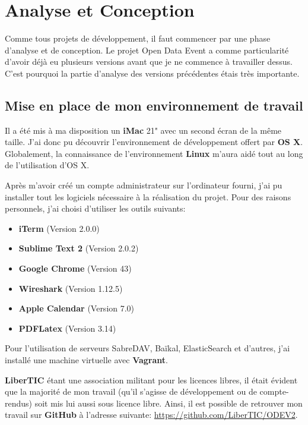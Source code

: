 \section{Analyse et Conception}

Comme tous projets de développement, il faut commencer par une phase d'analyse et de conception. Le projet Open Data Event a comme particularité d'avoir déjà eu plusieurs versions avant que je ne commence à travailler dessus. C'est pourquoi la partie d'analyse des versions précédentes étais très importante.

\subsection{Mise en place de mon environnement de travail}

Il a été mis à ma disposition un \textbf{iMac} 21" avec un second écran de la même taille. J'ai donc pu découvrir l'environnement de développement offert par \textbf{OS X}. Globalement, la connaissance de l'environnement \textbf{Linux} m'aura aidé tout au long de l'utilisation d'OS X.

Après m'avoir créé un compte administrateur sur l'ordinateur fourni, j'ai pu installer tout les logiciels nécessaire à la réalisation du projet. Pour des raisons personnels, j'ai choisi d'utiliser les outils suivants:

\begin{itemize}
    \item \textbf{iTerm} (Version 2.0.0)
    \item \textbf{Sublime Text 2} (Version 2.0.2)
    \item \textbf{Google Chrome} (Version 43)
    \item \textbf{Wireshark} (Version 1.12.5)
    \item \textbf{Apple Calendar} (Version 7.0)
    \item \textbf{PDFLatex} (Version 3.14)
\end{itemize}

Pour l'utilisation de serveurs SabreDAV, Baïkal, ElasticSearch et d'autres, j'ai installé une machine virtuelle avec \textbf{Vagrant}.

\textbf{LiberTIC} étant une association militant pour les licences libres, il était évident que la majorité de mon travail (qu'il s'agisse de développement ou de compte-rendus) soit mis lui aussi sous licence libre. Ainsi, il est possible de retrouver mon travail sur \textbf{GitHub} à l'adresse suivante: \url{https://github.com/LiberTIC/ODEV2}.

